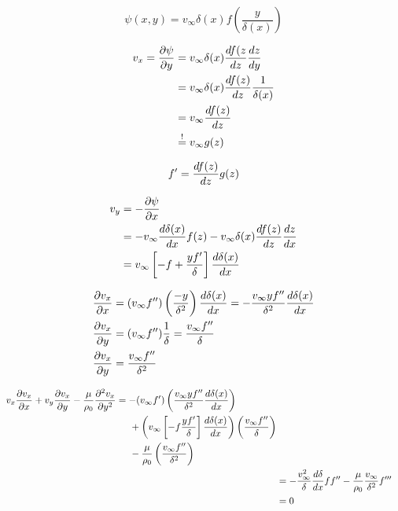 \begin{equation}
\psi(x,y) = v_\infty\delta(x)f\left(\frac{y}{\delta(x)}\right)
\end{equation}

\begin{align}
v_x=\frac{\partial \psi}{\partial y} &= v_\infty\delta(x)\frac{d f(z}{d z}\frac{d z}{d y} \\
&= v_\infty \delta(x) \frac{d f(z)}{d z}\frac{1}{\delta(x)}\\
&= v_\infty \frac{d f(z)}{d z} \\
&\overset{!}{=} v_\infty g(z)
\end{align}

\begin{equation}
f' = \frac{d f(z)}{d z}g(z)
\end{equation}

\noindent\makebox[\linewidth]{\rule{\textwidth}{0.5pt}}

\begin{align}
v_y &= -\frac{\partial \psi}{\partial x} \\
&=  -v_\infty\frac{d \delta(x)}{d x}f(z) - v_\infty \delta(x)\frac{d f(z)}{d z}\frac{d z}{d x}\\
&= v_\infty \left[-f + \frac{y f'}{\delta}\right] \frac{d \delta(x)}{d x}
\end{align}

\begin{align}
\frac{\partial v_x}{\partial x} &= \left(v_\infty f''\right)\left(\frac{-y}{\delta^2}\right)\frac{d \delta(x)}{d x} = -\frac{v_\infty y f''}{\delta^2}\frac{d \delta(x)}{d x} \\
\frac{\partial v_x}{\partial y} &= (v_\infty f'') \frac{1}{\delta} = \frac{v_\infty f''}{\delta} \\
\frac{\partial v_x}{\partial y} &= \frac{v_\infty f''}{\delta^2}
\end{align}

\begin{align}
\begin{split}
v_x\frac{\partial v_x}{\partial x} + v_y\frac{\partial v_x}{\partial y} - \frac{\mu}{\rho_0}\frac{\partial^2 v_x}{\partial y^2} &=
-(v_\infty f') \left(\frac{v_\infty y f''}{\delta^2} \frac{d \delta(x)}{d x}\right) \\
&\hspace{5mm} + \left(v_\infty\left[-f\frac{yf'}{\delta}\right]\frac{d \delta(x)}{d x}\right) \left(\frac{v_\infty f''}{\delta}\right) \\
&\hspace{5mm} -\frac{\mu}{\rho_0} \left(\frac{v_\infty f''}{\delta^2}\right)
\end{split} \\
&= -\frac{v_\infty^2}{\delta}\frac{d \delta}{d x} ff'' - \frac{\mu}{\rho_0} \frac{v_\infty}{\delta^2}f'''\\
&= 0
\end{align}

